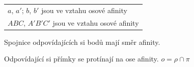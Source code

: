 \documentclass[11pt,a4paper]{article}
\begin{document}
\hfill\begin{tabular}{l}
$a$, $a'$; $b$, $b'$ jsou ve vztahu osové afinity\\
$ABC$, $A'B'C'$ jsou ve vztahu osové afinity
\end{tabular}

\begin{description}[nosep, leftmargin=2em, labelwidth=1.5em]
\item[V:] Spojnice odpovídajících si bodů mají směr afinity.
\item[V:] Odpovídající si přímky se protínají na ose afinity. \hfill $o=\rho\cap\pi$
\end{description}
\end{document}
